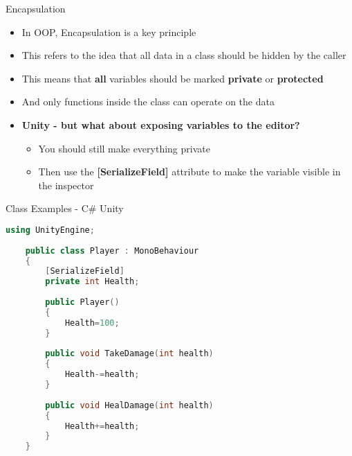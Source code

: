 \begin{frame}{Encapsulation}
	\begin{itemize}
		\pause \item In OOP, Encapsulation is a key principle 
		\pause \item This refers to the idea that all data in a class should be hidden by the caller
		\pause \item This means that \textbf{all} variables should be marked \textbf{private} or \textbf{protected}
		\pause \item And only functions inside the class can operate on the data
		\pause \item \textbf{Unity - but what about exposing variables to the editor?}
		\begin{itemize}
			\pause \item You should still make everything private
			\pause \item Then use the \textbf{[SerializeField]} attribute to make the variable visible in the inspector
		\end{itemize}
	\end{itemize}
\end{frame}


\begin{frame}[fragile]{Class Examples - C\# Unity}
	\begin{lstlisting}[language=C++,basicstyle=\tiny,]
	using UnityEngine;
	
	public class Player : MonoBehaviour
	{
		[SerializeField]
		private int Health;
	
		public Player()
		{
			Health=100;
		}
	
		public void TakeDamage(int health)
		{
			Health-=health;
		}
	
		public void HealDamage(int health)
		{
			Health+=health;
		}
	}
	\end{lstlisting}
\end{frame}

